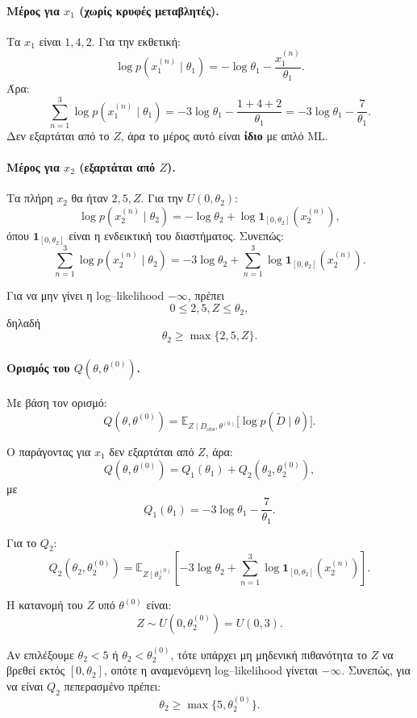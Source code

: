 \documentclass[a4paper,11pt]{article}
\begin{document}
\paragraph{Μέρος για $x_1$ (χωρίς κρυφές μεταβλητές).}

Τα $x_1$ είναι $1,4,2$. Για την εκθετική:
\[
\log p(x_1^{(n)} \mid \theta_1)
= -\log \theta_1 - \frac{x_1^{(n)}}{\theta_1}.
\]
Άρα:
\[
\sum_{n=1}^3 \log p(x_1^{(n)} \mid \theta_1)
= -3\log\theta_1 - \frac{1+4+2}{\theta_1}
= -3\log\theta_1 - \frac{7}{\theta_1}.
\]
Δεν εξαρτάται από το $Z$, άρα το μέρος αυτό είναι \textbf{ίδιο}
με απλό ML.

\paragraph{Μέρος για $x_2$ (εξαρτάται από $Z$).}

Τα πλήρη $x_2$ θα ήταν $2,5,Z$.
Για την $U(0,\theta_2)$:
\[
\log p(x_2^{(n)} \mid \theta_2)
= -\log\theta_2 + \log \mathbf{1}_{[0,\theta_2]}(x_2^{(n)}),
\]
όπου $\mathbf{1}_{[0,\theta_2]}$ είναι η ενδεικτική του διαστήματος.
Συνεπώς:
\[
\sum_{n=1}^3 \log p(x_2^{(n)} \mid \theta_2)
= -3\log\theta_2 + \sum_{n=1}^3 \log \mathbf{1}_{[0,\theta_2]}(x_2^{(n)}).
\]

Για να μην γίνει η log–likelihood $-\infty$, πρέπει
\[
0\le 2,5,Z \le \theta_2,
\]
δηλαδή
\[
\theta_2 \ge \max\{2,5,Z\}.
\]

\paragraph{Ορισμός του $Q(\theta,\theta^{(0)})$.}

Με βάση τον ορισμό:
\[
Q(\theta,\theta^{(0)})
= \mathbb{E}_{Z \mid D_{\text{obs}},\theta^{(0)}}
  \big[ \log p(\tilde{D}\mid \theta) \big].
\]

Ο παράγοντας για $x_1$ δεν εξαρτάται από $Z$, άρα:
\[
Q(\theta,\theta^{(0)}) = Q_1(\theta_1) + Q_2(\theta_2,\theta_2^{(0)}),
\]
με
\[
Q_1(\theta_1) = -3\log\theta_1 - \frac{7}{\theta_1}.
\]

Για το $Q_2$:
\[
Q_2(\theta_2,\theta_2^{(0)})
= \mathbb{E}_{Z \mid \theta_2^{(0)}}
  \left[ -3\log\theta_2 + \sum_{n=1}^3
         \log \mathbf{1}_{[0,\theta_2]}(x_2^{(n)}) \right].
\]

Η κατανομή του $Z$ υπό $\theta^{(0)}$ είναι:
\[
Z \sim U(0,\theta_2^{(0)}) = U(0,3).
\]

Αν επιλέξουμε $\theta_2 < 5$ ή $\theta_2 < \theta_2^{(0)}$, τότε υπάρχει
μη μηδενική πιθανότητα το $Z$ να βρεθεί εκτός $[0,\theta_2]$, οπότε
η αναμενόμενη log–likelihood γίνεται $-\infty$.
Συνεπώς, για να είναι $Q_2$ πεπερασμένο πρέπει:
\[
\theta_2 \ge \max\{5,\theta_2^{(0)}\}.
\]
\end{document}
